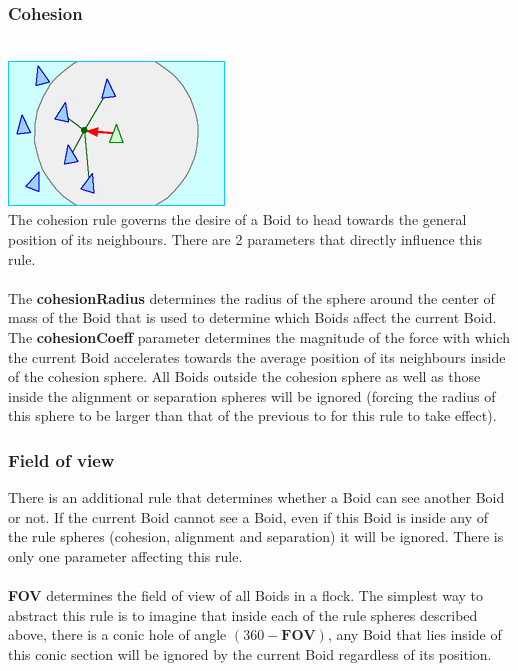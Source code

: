 \documentclass[12pt]{article}
\begin{document}
\subsubsection{Cohesion}
\\ \includegraphics[width=\textwidth,height=\textheight,keepaspectratio]{Rule_cohesion.gif} \\
The cohesion rule governs the desire of a Boid to head towards the general position of its neighbours. There are 2 parameters that directly influence this rule.
\\ \\
The \textbf{cohesionRadius} determines the radius of the sphere around the center of mass of the Boid that is used to determine which Boids affect the current Boid. The \textbf{cohesionCoeff} parameter determines the magnitude of the force with which the current Boid  accelerates towards the average position of its neighbours inside of the cohesion sphere. All Boids outside the cohesion sphere as well as those inside the alignment or separation spheres will be ignored (forcing the radius of this sphere to be larger than that of the previous to for this rule to take effect).

\subsubsection{Field of view}
There is an additional rule that determines whether a Boid can see another Boid or not. If the current Boid cannot see a Boid, even if this Boid is inside any of the rule spheres (cohesion, alignment and separation) it will be ignored. There is only one parameter affecting this rule.
\\ \\
\textbf{FOV} determines the field of view of all Boids in a flock. The simplest way to abstract this rule is to imagine that inside each of the rule spheres described above, there is a conic hole of angle $(360 - \textbf{FOV})$, any Boid that lies inside of this conic section will be ignored by the current Boid regardless of its position.
\end{document}
